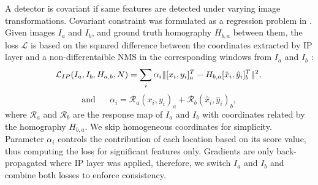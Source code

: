 
A detector is covariant if same features are detected under varying image transformations. 
Covariant constraint was formulated as a regression problem in \cite{Karel_Vedaldi_ECCV_16}. 
Given images $I_{a}$ and $I_{b}$, and ground truth homography $H_{b,a}$ between them,  the loss $\mathcal{L}$ is based on the squared difference between the coordinates extracted by IP layer and a non-differentaible NMS in the corresponding windows from $I_{a}$ and $I_{b}$ :
\begin{equation*}
\mathcal{L}_{IP}(I_a,I_b,H_{a,b}, N) = \sum_{\substack{i}} \alpha_i\| [{x_i}, {y_i}]^T_{a} - H_{b,a}[{\hat{x}_i}, {\hat{y}_i}]^T_{b}\|^2, \\
\end{equation*}
\begin{equation}
\textrm{and  } \textrm{ } \textrm{ } \alpha_i =  \mathcal{R}_{a}({x_i}, {y_i})_{a} + \mathcal{R}_{b}({\hat{x}_i}, {\hat{y}_i})_{b},
\label{eq:context_losses}
\end{equation}
where $\mathcal{R}_{a}$ and $\mathcal{R}_{b}$ are the response map of $I_a$ and $I_b$ with coordinates related by the homography $H_{b,a}$. We skip homogeneous coordinates for simplicity. Parameter $\alpha_{i}$ controls the contribution of each location based on its score value, thus computing the loss for significant features only. Gradients are only back-propagated where IP layer was applied, therefore, we switch $I_{a}$ and $I_{b}$ and combine both losses to enforce consistency. 


